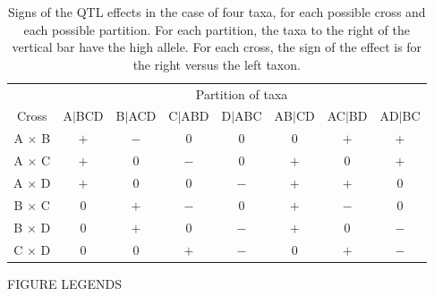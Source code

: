 \documentclass[12pt,letterpaper]{article}
\begin{document}
\begin{table}[h]
\caption{Signs of the QTL effects in the case of four taxa, for each
  possible cross and each possible partition. For each partition, the
  taxa to the right of the vertical bar have the high allele.  For
  each cross, the sign of the effect is for the right versus the left
  taxon.\label{table}}  

\bigskip \bigskip

\centering
\renewcommand{\arraystretch}{2.0}
\begin{tabular}{cccccccc}
\hline 
& \multicolumn{7}{c}{Partition of taxa} \\ \cline{2-8}
Cross        & A$|$BCD & B$|$ACD & C$|$ABD & D$|$ABC & AB$|$CD &
AC$|$BD & AD$|$BC \\ \hline
A $\times$ B & $+$  & $-$  & 0    & 0    & 0   & $+$  & $+$ \\
A $\times$ C & $+$  & 0    & $-$  & 0    & $+$ & 0    & $+$ \\ 
A $\times$ D & $+$  & 0    & 0    & $-$  & $+$ & $+$  & 0   \\ 
B $\times$ C & 0    & $+$  & $-$  & 0    & $+$ & $-$  & 0   \\ 
B $\times$ D & 0    & $+$  & 0    & $-$  & $+$ & 0    & $-$ \\ 
C $\times$ D & 0    & 0    & $+$  & $-$  & 0   & $+$  & $-$ \\ 
\hline
\end{tabular}
\end{table}


\newpage

\centerline{FIGURE LEGENDS}
\end{document}
